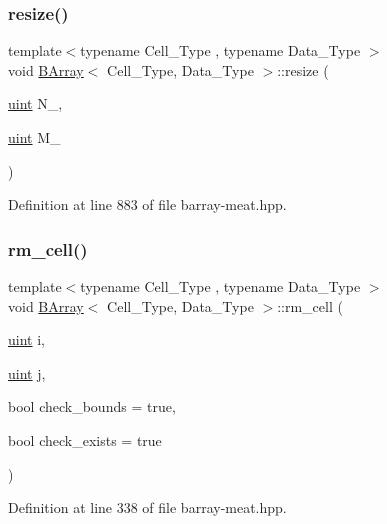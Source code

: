 \subsubsection{\texorpdfstring{resize()}{resize()}}
{\footnotesize\ttfamily template$<$typename Cell\+\_\+\+Type , typename Data\+\_\+\+Type $>$ \\
void \hyperlink{class_b_array}{B\+Array}$<$ Cell\+\_\+\+Type, Data\+\_\+\+Type $>$\+::resize (\begin{DoxyParamCaption}\item[{\hyperlink{typedefs_8hpp_a91ad9478d81a7aaf2593e8d9c3d06a14}{uint}}]{N\+\_\+,  }\item[{\hyperlink{typedefs_8hpp_a91ad9478d81a7aaf2593e8d9c3d06a14}{uint}}]{M\+\_\+ }\end{DoxyParamCaption})\hspace{0.3cm}{\ttfamily [inline]}}



Definition at line 883 of file barray-\/meat.\+hpp.

\mbox{\label{group__barray-insert_gaaead894ff275479db4f733793ce037db}} 
\subsubsection{\texorpdfstring{rm\+\_\+cell()}{rm\_cell()}}
{\footnotesize\ttfamily template$<$typename Cell\+\_\+\+Type , typename Data\+\_\+\+Type $>$ \\
void \hyperlink{class_b_array}{B\+Array}$<$ Cell\+\_\+\+Type, Data\+\_\+\+Type $>$\+::rm\+\_\+cell (\begin{DoxyParamCaption}\item[{\hyperlink{typedefs_8hpp_a91ad9478d81a7aaf2593e8d9c3d06a14}{uint}}]{i,  }\item[{\hyperlink{typedefs_8hpp_a91ad9478d81a7aaf2593e8d9c3d06a14}{uint}}]{j,  }\item[{bool}]{check\+\_\+bounds = {\ttfamily true},  }\item[{bool}]{check\+\_\+exists = {\ttfamily true} }\end{DoxyParamCaption})\hspace{0.3cm}{\ttfamily [inline]}}



Definition at line 338 of file barray-\/meat.\+hpp.

